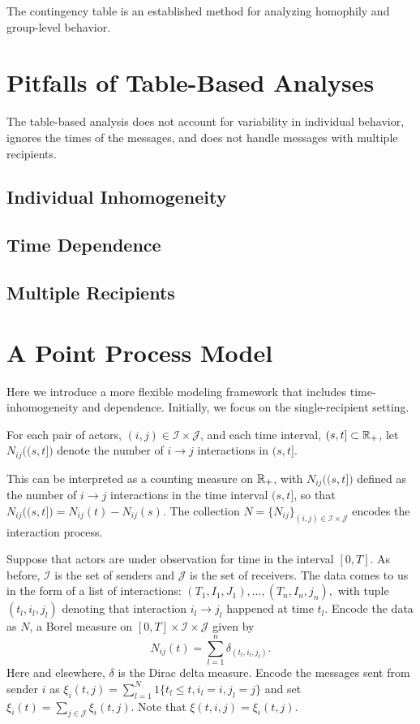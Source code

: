 \documentclass[aoas,preprint]{imsart}
\begin{document}
The contingency table is an established method for analyzing homophily and
group-level behavior.

\section{Pitfalls of Table-Based Analyses}

The table-based analysis does not account for variability in individual
behavior, ignores the times of the messages, and does not handle messages with
multiple recipients.

\subsection{Individual Inhomogeneity}
\subsection{Time Dependence}
\subsection{Multiple Recipients}


\section{A Point Process Model}

Here we introduce a more flexible modeling framework that includes
time-inhomogeneity and dependence.  Initially, we focus on the
single-recipient setting.

For each pair of actors, $(i,j) \in \mathcal{I} \times \mathcal{J}$, and each
time interval, $(s,t] \subset \mathbb{R}_+$, let $N_{ij}\big((s,t]\big)$ denote the
number of $i \to j$ interactions in $(s,t]$.


This can be interpreted as a counting measure on
$\mathbb{R}_+$, with $N_{ij}\big((s,t]\big)$ defined as the
number of $i \to j$ interactions in the time interval $(s,t]$, so that
$N_{ij}\big((s,t]\big) = N_{ij}(t) - N_{ij}(s)$. The collection
$N = \{ N_{ij} \}_{(i,j) \in \mathcal{I} \times \mathcal{J}}$ encodes the
interaction process.

Suppose that actors are under observation for time in the interval $[0,T]$. As
before, $\mathcal{I}$ is the set of senders and $\mathcal{J}$ is the set of
receivers. The data comes to us in the form of a list of interactions: $(T_1,
I_1, J_1), \ldots, (T_n, I_n, j_n),$ with tuple $(t_l, i_l, j_l)$ denoting
that interaction $i_l \to j_l$ happened at time $t_l$.  Encode the data as
$N$, a Borel measure on $[0,T] \times \mathcal{I} \times \mathcal{J}$ given
by
\[
    N_{ij}(t) = \sum_{l=1}^{n} \delta_{(t_l, i_l, j_l)}.
\]
Here and elsewhere, $\delta$ is the Dirac delta measure.  Encode the messages
sent from sender $i$ as 
$\xi_i(t, j) = \sum_{l=1}^N 1\{t_l \leq t, i_l = i, j_l = j\}$ and set
$\xi_i(t) = \sum_{j \in \mathcal{J}} \xi_i(t,j)$.  Note that
$\xi(t, i, j) = \xi_i(t, j)$.
\end{document}
